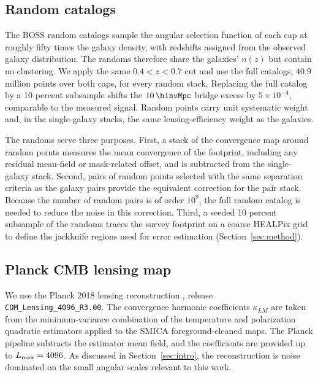 \subsection{Random catalogs}
\label{sec:data_random}

The BOSS random catalogs \citep{Reid2016} sample the angular selection
function of each cap at roughly fifty times the galaxy density, with
redshifts assigned from the observed galaxy distribution. The randoms
therefore share the galaxies' $n(z)$ but contain no clustering. We apply the
same $0.4<z<0.7$ cut and use the full catalogs, $40.9$ million points over
both caps, for every random stack. Replacing the full catalog by a 10 percent
subsample shifts the $10\,\hinvMpc$ bridge excess by
$5\times10^{-4}$, comparable to the measured signal.
Random points carry unit systematic weight and, in the single-galaxy stacks,
the same lensing-efficiency weight as the galaxies.

The randoms serve three purposes. First, a stack of the convergence map
around random points measures the mean convergence of the footprint,
including any residual mean-field or mask-related offset, and is subtracted
from the single-galaxy stack. Second, pairs of random points selected with
the same separation criteria as the galaxy pairs provide the equivalent
correction for the pair stack. Because the number of random pairs is of
order $10^{9}$, the full random catalog is needed to reduce the noise in this
correction. Third, a seeded 10 percent subsample of the randoms traces the
survey footprint on a coarse HEALPix grid to define the jackknife regions
used for error estimation (Section~\ref{sec:method}).

\subsection{Planck CMB lensing map}
\label{sec:data_planck}

We use the Planck 2018 lensing reconstruction \citep{Planck2018lensing},
release \texttt{COM\_Lensing\_4096\_R3.00}. The convergence harmonic
coefficients $\kappa_{LM}$ are taken from the minimum-variance combination
of the temperature and polarization quadratic estimators applied to the
SMICA foreground-cleaned maps. The Planck pipeline subtracts the estimator
mean field, and the coefficients are provided up to
$L_{\rm max}=4096$. As discussed in Section~\ref{sec:intro}, the
reconstruction is noise dominated on the small angular scales relevant to
this work.

